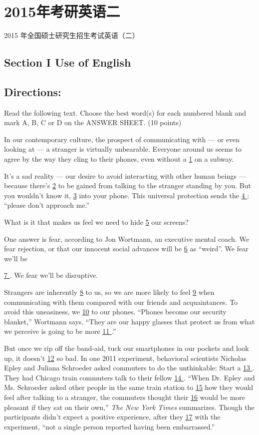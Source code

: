 \documentclass[UTF8,11pt]{ctexart}
\begin{document}
\section*{2015年考研英语二}
2015 年全国硕士研究生招生考试英语（二）


\subsection*{\textbf{Section I Use of English}}


\subsection*{\textbf{Directions:}}


Read the following text. Choose the best word(s) for each numbered blank and mark A, B, C or D on the ANSWER SHEET. (10 points)


In our contemporary culture, the prospect of communicating with — or even looking at — a stranger is virtually unbearable. Everyone around us seems to agree by the way they cling to their phones, even without a \uline{1} on a subway.


It’s a sad reality — our desire to avoid interacting with other human beings — because there’s \uline{2} to be gained from talking to the stranger standing by you. But you wouldn’t know it, \uline{3} into your phone. This universal protection sends the \uline{4 }: “please don’t approach me.”


What is it that makes us feel we need to hide \uline{5} our screens?


One answer is fear, according to Jon Wortmann, an executive mental coach. We fear rejection, or that our innocent social advances will be \uline{6} as “weird”. We fear we’ll be


\uline{7 }. We fear we’ll be disruptive.


Strangers are inherently \uline{8} to us, so we are more likely to feel \uline{9} when communicating with them compared with our friends and acquaintances. To avoid this uneasiness, we \uline{10} to our phones. “Phones become our security blanket,” Wortmann says. “They are our happy glasses that protect us from what we perceive is going to be more \uline{11 }.”


But once we rip off the band-aid, tuck our smartphones in our pockets and look up, it doesn’t \uline{12} so bad. In one 2011 experiment, behavioral scientists Nicholas Epley and Juliana Schroeder asked commuters to do the unthinkable: Start a \uline{13 }. They had Chicago train commuters talk to their fellow \uline{14 }. “When Dr. Epley and Ms. Schroeder asked other people in the same train station to \uline{15} how they would feel after talking to a stranger, the commuters thought their \uline{16} would be more pleasant if they sat on their own,” \textit{The New York Times} summarizes. Though the participants didn’t expect a positive experience, after they \uline{17} with the experiment, “not a single person reported having been embarrassed.”
\end{document}
